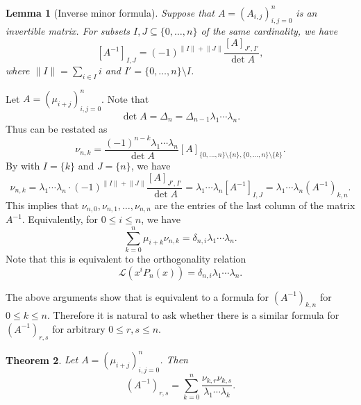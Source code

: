 \documentclass[oneside]{book}
\numberwithin{equation}{section}
\newtheorem{thm}{Theorem}[section]
\newtheorem{lem}[thm]{Lemma}
\theoremstyle{definition}
\newcommand\LL{\mathcal{L}}
\newcommand\norm[1]{\lVert #1\rVert}
\begin{document}
\begin{lem}[Inverse minor formula]\label{lem:inv-minor}
  Suppose that \( A=(A_{i,j})_{i,j=0}^{n}\) is an invertible matrix. For subsets
  \( I,J\subseteq \{0,\dots,n\} \) of the same cardinality, we have
  \[
    \left[A^{-1}\right]_{I, J}=(-1)^{\norm{I}+\norm{J}} \frac{[A]_{J', I'}}{\det A},
  \]
  where \( \norm I=\sum_{i\in I}i \) and \( I'=\{0,\dots,n\}\setminus I \).
\end{lem}

Let \( A = (\mu_{i+j})_{i,j=0}^n \). Note that
\[
  \det A = \Delta_n = \Delta_{n-1} \lambda_1 \cdots \lambda_n.
\]
Thus  can be restated as
\[
  \nu_{n,k} = \frac{(-1)^{n-k}\lambda_1 \cdots \lambda_n}{\det A} [A]_{\{0,\dots,n\}\setminus\{n\},\{0,\dots,n\}\setminus\{k\}}.
\]
By  with \( I=\{k\} \) and \( J=\{n\} \),
we have
\[
  \nu_{n,k} = \lambda_1 \cdots \lambda_n\cdot 
(-1)^{\norm{I}+\norm{J}} \frac{[A]_{J', I'}}{\det A}
= \lambda_1 \cdots \lambda_n[A^{-1}]_{I,J}
= \lambda_1 \cdots \lambda_n(A^{-1})_{k,n}.
\]
This implies that \( \nu_{n,0}, \nu_{n,1},\dots,\nu_{n,n} \) are the
entries of the last column of the matrix \( A^{-1} \).
Equivalently, for \( 0\le i\le n \), we have
\[
  \sum_{k=0}^n \mu_{i+k} \nu_{n,k} = \delta_{n,i} \lambda_1 \cdots
  \lambda_n.
\]
Note that this is equivalent to
the orthogonality relation
\[
  \LL(x^iP_n(x)) = \delta_{n,i} \lambda_1 \cdots \lambda_n.
\]


The above arguments show that  is equivalent to a formula
for \( (A^{-1})_{k,n} \) for \( 0\le k\le n \). Therefore it is
natural to ask whether there is a similar formula for
\( (A^{-1})_{r,s} \) for arbitrary \( 0\le r,s\le n \).

\begin{thm}\label{thm:13}
Let \( A = (\mu_{i+j})_{i,j=0}^n \). 
Then
\[
  (A^{-1})_{r,s} = \sum_{k=0}^{n} \frac{\nu_{k,r}\nu_{k,s}}{\lambda_1 \cdots \lambda_k}.
\]
\end{thm}
\end{document}
